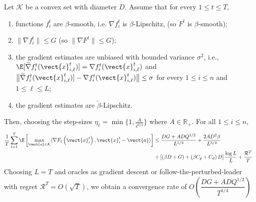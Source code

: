 \begin{theorem}
\label{thm:stoc:version2}
Let $\mathcal{K}$ be a convex set with diameter $D$. Assume that for every $1 \leq t \leq T$, 
\begin{enumerate}
	\item functions $f^{t}_{i}$ are $\beta$-smooth, i.e. $\nabla f^{t}_{i}$ is $\beta$-Lipschitz,  (so $F^{t}$ is $\beta$-smooth);
	\item $\| \nabla f^{t}_{i}\| \leq G$ (so $\| \nabla F^{t}\| \leq G$);
	\item the gradient estimates are unbiased with bounded variance $\sigma^{2}$, i.e., 
		$\E [\widetilde{\nabla} f^{t}_{i}(\vect{x}^{t}_{i,\ell})] = \nabla f^{t}_{i}(\vect{x}^{t}_{i,\ell})$
		and $\bigl \| \widetilde{\nabla} f^{t}_{i}(\vect{x}^{t}_{i,\ell})] - \nabla f^{t}_{i}(\vect{x}^{t}_{i,\ell}) \bigr \| \leq \sigma$
		for every $1 \leq i \leq n$ and $1 \leq \ell \leq L$;
	\item the gradient estimates are $\widetilde{\beta}$-Lipschitz.
\end{enumerate}
Then, choosing the step-sizes $\eta_\ell = \min \{1, \frac{A}{\ell^{3/4}}\}$ where $A \in \mathbb{R}_+$. For all $1 \leq i \leq n$, 
\begin{align*}
    \frac{1}{T} \sum_{t=1}^T \E\left[ \max_{\vect{a} \in \mathcal{K}} \langle \nabla F_t\left( \vect{x}_i^t \right), \vect{x}_i^t - \vect{a} \rangle \right]
    &\leq \frac{DG + ADQ^{1/2}}{L^{1/4}} + \frac{2AD^2\beta}{L^{3/4}} \\
    &+\left[ \left(\beta D + G\right) + \left(\beta C_p + C_d\right)D \right]  \frac{\log L }{L} + \frac{\mathcal{R}^T}{T} 
\end{align*}
Choosing $L=T$ and oracles as gradient descent or follow-the-perturbed-leader with regret $\mathcal{R}^T =
O\left(\sqrt{T}\right)$, we obtain a convergence rate of $O\left( \dfrac{DG + ADQ^{1/2}}{T^{1/4}} \right)$

\end{theorem}


